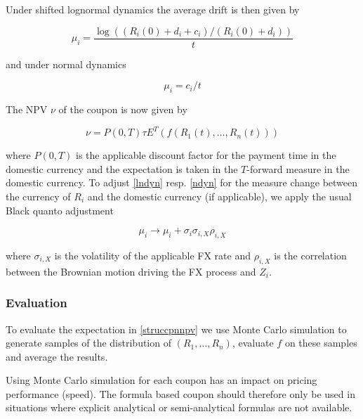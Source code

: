 Under shifted lognormal dynamics the average drift is then given by

\begin{equation*} 
\mu_i = \frac{\log( (R_i(0)+d_i+c_i) / (R_i(0)+d_i))}{t}
\end{equation*}

and under normal dynamics

\begin{equation*} 
\mu_i = c_i / t
\end{equation*}

The NPV $\nu$ of the coupon is now given by

\begin{equation}\label{struccpnnpv} 
\nu = P(0,T) \tau E^T ( f(R_1(t),\ldots, R_n(t)) )
\end{equation}

where $P(0,T)$ is the applicable discount factor for the payment time
in the domestic currency and the expectation is taken in the
$T$-forward measure in the domestic currency. To adjust \ref{lndyn}
resp. \ref{ndyn} for the measure change between the currency of $R_i$
and the domestic currency (if applicable), we apply the usual Black
quanto adjustment

\begin{equation*}
  \mu_i \rightarrow \mu_i + \sigma_i \sigma_{i,X} \rho_{i,X}
\end{equation*}

where $\sigma_{i,X}$ is the volatility of the applicable FX rate and
$\rho_{i,X}$ is the correlation between the Brownian motion driving
the FX process and $Z_i$.

\subsubsection*{Evaluation}

To evaluate the expectation in \ref{struccpnnpv} we use Monte Carlo
simulation to generate samples of the distribution of
$(R_1, \ldots, R_n)$, evaluate $f$ on these samples and average the
results.

Using Monte Carlo simulation for each coupon has an impact on 
pricing performance (speed). The formula based coupon should therefore
only be used in situations where explicit analytical or
semi-analytical formulas are not available.


